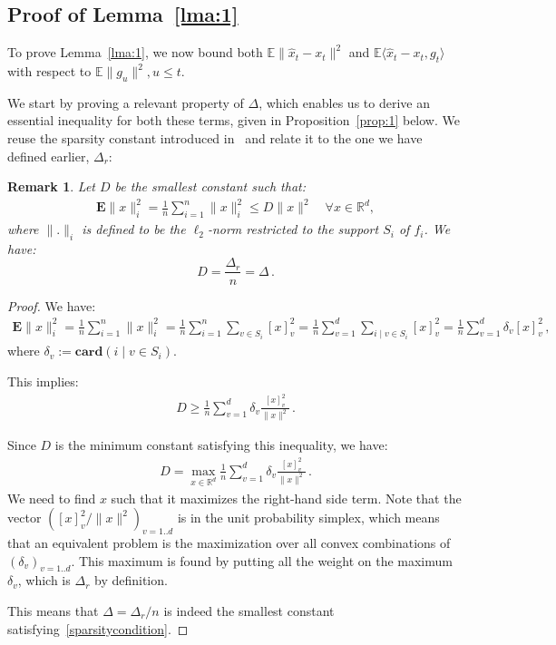 \documentclass[twoside]{article}
\newcommand{\sparsity}{\Delta}
\newcommand{\sparsityr}{\Delta_r}
\newcommand{\E}{\mathbb{E}}
\newcommand{\Econd}{\mathbf{E}}
\newtheorem{remark}{Remark}
\begin{document}
\subsection{Proof of Lemma~\ref{lma:1}} \label{apxB:lma1}
To prove Lemma~\ref{lma:1}, we now bound both $\E\|\hat x_t - x_t\|^2$ and $\E\langle \hat x_t -x_t,  g_t\rangle$ with respect to $\E\|g_u\|^2, u\leq t$.

We start by proving a relevant property of $\sparsity$, which enables us to derive an essential inequality for both these terms, given in Proposition~\ref{prop:1} below.
We reuse the sparsity constant introduced in~\citet{smola} and relate it to the one we have defined earlier, $\sparsityr$:
\begin{remark} \label{rmk:1}
Let $D$ be the smallest constant such that:
\begin{align} \label{sparsitycondition}
\Econd \|x\|_i^2 = \frac{1}{n} \sum_{i=1}^n \|x\|_i^2 \leq D \|x\|^2 \quad  \forall x \in \mathbb{R}^d,
\end{align}
where $\|.\|_i$ is defined to be the $\ell_2$-norm restricted to the support $S_i$ of $f_i$. 
We have:
\begin{equation}
D = \frac{\sparsityr}{n} = \sparsity  \, .
\end{equation}
\end{remark}

\begin{proof}
We have:
\begin{align}
\Econd \|x\|_i^2 = \frac{1}{n} \sum_{i=1}^n \|x\|_i^2
= \frac{1}{n} \sum_{i=1}^n \sum_{v \in S_i} [x]_v^2
= \frac{1}{n} \sum_{v=1}^d \sum_{i \mid v \in S_i} [x]_v^2
= \frac{1}{n} \sum_{v=1}^d \delta_v [x]_v^2 \, ,
\end{align}
where $\delta_v := \mathbf{card}(i \mid v \in S_i)$.

This implies:
\begin{align}
D \geq \frac{1}{n} \sum_{v=1}^d \delta_v \frac{[x]_v^2}{\|x\|^2}  \, .
\end{align}

Since $D$ is the minimum constant satisfying this inequality, we have:
\begin{align}
D = \max_{x \in \mathbb{R}^d} \frac{1}{n} \sum_{v=1}^d \delta_v \frac{[x]_v^2}{\|x\|^2}  \, .
\end{align}
We need to find $x$ such that it maximizes the right-hand side term.
Note that the vector $([x]_v^2 / \|x\|^2)_{v=1..d}$ is in the unit probability simplex, which means that an equivalent problem is the maximization over all convex combinations of $(\delta_v)_{v=1..d}$.
This maximum is found by putting all the weight on the maximum $\delta_v$, which is $\sparsityr$ by definition.

This means that $\sparsity = \sparsityr / n$ is indeed the smallest constant satisfying~\eqref{sparsitycondition}.
\end{proof}
\end{document}

